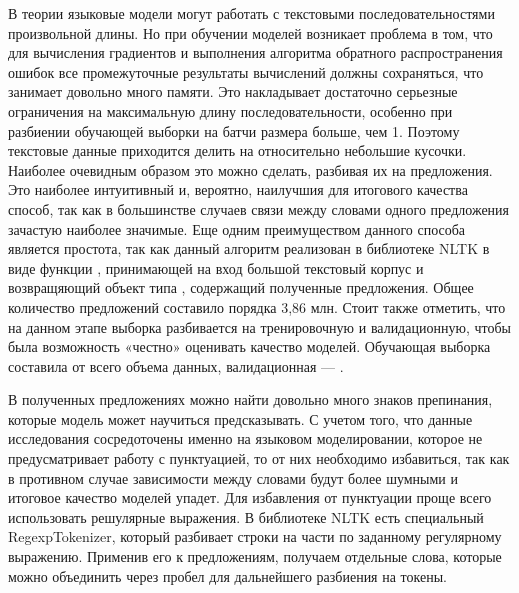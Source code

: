 В теории языковые модели могут работать с текстовыми последовательностями произвольной длины. Но при обучении моделей возникает проблема в том, что для вычисления градиентов и выполнения алгоритма обратного распространения ошибок все промежуточные результаты вычислений должны сохраняться, что занимает довольно много памяти. Это накладывает достаточно серьезные ограничения на максимальную длину последовательности, особенно при разбиении обучающей выборки на батчи размера больше, чем 1. Поэтому текстовые данные приходится делить на относительно небольшие кусочки. Наиболее очевидным образом это можно сделать, разбивая их на предложения. Это наиболее интуитивный и, вероятно, наилучшия для итогового качества способ, так как в большинстве случаев связи между словами одного предложения зачастую наиболее значимые. Еще одним преимуществом данного способа является простота, так как данный алгоритм реализован в библиотеке NLTK в виде функции , принимающей на вход большой текстовый корпус и возвращяющий объект типа , содержащий полученные предложения. Общее количество предложений составило порядка 3,86 млн. Стоит также отметить, что на данном этапе выборка разбивается на тренировочную и валидационную, чтобы была возможность «честно» оценивать качество моделей. Обучающая выборка составила  от всего объема данных, валидационная --- .

В полученных предложениях можно найти довольно много знаков препинания, которые модель может научиться предсказывать. С учетом того, что данные исследования сосредоточены именно на языковом моделировании, которое не предусматривает работу с пунктуацией, то от них необходимо избавиться, так как в противном случае зависимости между словами будут более шумными и итоговое качество моделей упадет. Для избавления от пунктуации проще всего использовать решулярные выражения. В библиотеке NLTK есть специальный RegexpTokenizer, который разбивает строки на части по заданному регулярному выражению. Применив его к предложениям, получаем отдельные слова, которые можно объединить через пробел для дальнейшего разбиения на токены.


